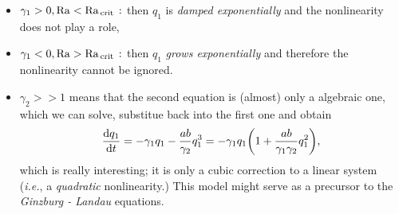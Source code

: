 \documentclass[reqno, a4paper]{article}
\begin{document}
\begin{itemize}
	\item $\gamma_1>0, \mathrm{Ra} < \mathrm{Ra}_{\, \text{crit} \,}:$ then $q_1$ is \textit{damped exponentially} and the nonlinearity does not play a role,
	\item $\gamma_1<0, \mathrm{Ra} > \mathrm{Ra}_{\, \text{crit} \,}:$ then $q_1$ \textit{grows exponentially} and therefore the nonlinearity cannot be ignored.
	\item $\gamma_2 >>1$ means that the second equation is (almost) only a algebraic one, which we can solve, substitue back into the first one and obtain
		\[
			\dv{q_1}{t} = -\gamma_1 q_1 - \frac{ab}{\gamma_2}q_1^{3} = -\gamma_1 q_1\qty(1+\frac{ab}{\gamma_1\gamma_2}q_1^{2}),
		\]
		which is really interesting; it is only a cubic correction to a linear system (\textit{i.e.}, a \textit{quadratic} nonlinearity.) This model might serve as a precursor to the \textit{Ginzburg - Landau} equations.
\end{itemize}
\end{document}
